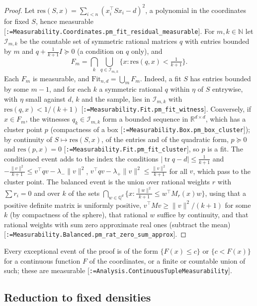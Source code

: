 \documentclass[11pt]{article}
\makeatletter
\newcommand{\formal@break}[1]{\@tfor\formal@tok:=#1\do{%
  \formal@tok
  \expandafter\ifx\formal@tok.\allowbreak\else
  \expandafter\ifx\formal@tok\_\allowbreak\fi\fi}}
\DeclareRobustCommand{\formal}[1]{\textnormal{[\texttt{\small\formal@break{#1}}]}}
\newcommand{\R}{\mathbb{R}}
\newcommand{\N}{\mathbb{N}}
\newcommand{\norm}[1]{\lVert #1\rVert}
\newcommand{\abs}[1]{\lvert #1\rvert}
\newcommand{\tr}{\operatorname{tr}}
\newcommand{\Id}{I}
\newcommand{\Fit}{\mathrm{Fit}}
\theoremstyle{plain}
\theoremstyle{definition}
\makeatother
\begin{document}
\begin{proof}
Let $\mathrm{res}(S, x) = \sum_{i<n}(x_i^{\top}Sx_i - d)^2$, a polynomial in
the coordinates for fixed $S$, hence measurable
\formal{Measurability.Coordinates.pm\_fit\_residual\_measurable}. For
$m, k \in \N$ let $\mathcal{I}_{m,k}$ be the countable set of symmetric
rational matrices $q$ with entries bounded by $m$ and
$q + \frac{1}{k+1}\Id \succeq 0$ (a condition on $q$ only), and
\[
F_m = \bigcap_k\bigcup_{q\in\mathcal{I}_{m,k}}\{x : \mathrm{res}(q, x) < \tfrac1{k+1}\}.
\]
Each $F_m$ is measurable, and $\Fit_{n,d} = \bigcup_mF_m$. Indeed, a fit $S$
has entries bounded by some $m - 1$, and for each $k$ a symmetric rational
$q$ within $\eta$ of $S$ entrywise, with $\eta$ small against $d$, $k$ and
the sample, lies in $\mathcal{I}_{m,k}$ with $\mathrm{res}(q,x) < 1/(k+1)$
\formal{Measurability.Fit.pm\_fit\_witness}. Conversely, if
$x \in F_m$, the witnesses $q_k \in \mathcal{I}_{m,k}$ form a bounded
sequence in $\R^{d\times d}$, which has a cluster point $p$ (compactness of
a box \formal{Measurability.Box.pm\_box\_cluster}); by continuity of
$S \mapsto \mathrm{res}(S, x)$, of the entries and of the quadratic form,
$p \succeq 0$ and $\mathrm{res}(p, x) = 0$ \formal{Measurability.Fit.pm\_fit\_cluster},
so $p$ is a fit. The conditioned event adds to the index the conditions
$\abs{\tr q - d} \le \frac1{k+1}$ and
$-\frac{\norm{v}^2}{k+1} \le v^{\top}qv - \lambda_-\norm{v}^2$,
$v^{\top}qv - \lambda_+\norm{v}^2 \le \frac{\norm{v}^2}{k+1}$ for all $v$, which pass
to the cluster point. The balanced event is the union over rational weights
$r$ with $\sum r_i = 0$ and over $k$ of the sets
$\bigcap_{w\in\mathbb{Q}^d}\{x : \frac{\norm{w}^2}{k+1} \le w^{\top}M_r(x)w\}$,
using that a positive definite matrix is uniformly positive,
$v^{\top}Mv \ge \norm{v}^2/(k+1)$ for some $k$ (by compactness of the sphere),
that rational $w$ suffice by continuity, and that rational weights with sum
zero approximate real ones (subtract the mean)
\formal{Measurability.Balanced.pm\_rat\_zero\_sum\_approx}.
\end{proof}

Every exceptional event of the proof is of the form $\{F(x) \le c\}$ or
$\{c < F(x)\}$ for a continuous function $F$ of the coordinates, or a finite
or countable union of such; these are measurable
\formal{Analysis.ContinuousTupleMeasurability}.

\subsection{Reduction to fixed densities}\label{sec:fixed}
\end{document}
